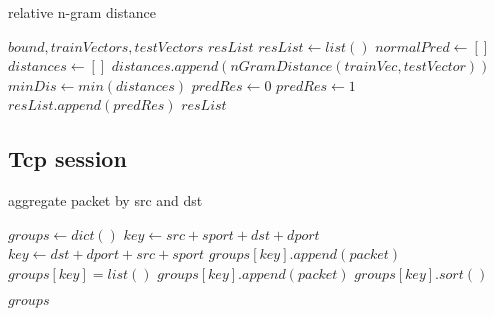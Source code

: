 \documentclass[preprint,12pt]{elsarticle}
\begin{document}
    \begin{algorithm}
        \caption{relative n-gram distance}
        \begin{algorithmic}[1]
            \Require $bound, trainVectors, testVectors$
            \Ensure $ resList$
            \State $ resList \gets list() $
            \State $normalPred \gets [] $
            \State $distances \gets []$
            \State $ distances.append(nGramDistance(trainVec, testVector))$
            \EndFor
            \State $minDis \gets min(distances)$
            \State $predRes \gets 0$
            \State $predRes \gets 1$
            \EndIf
            \State $resList.append(predRes)$
            \EndFor
            \State \Return $resList$
            \EndFunction
        \end{algorithmic}
    \end{algorithm}

    \subsection{Tcp session}
    \begin{algorithm}
        \caption{aggregate packet by src and dst}
        \begin{algorithmic}
            \State $ groups \gets dict() $
            \State $ key \gets src + sport + dst + dport $
            \Else
            \State $ key \gets dst + dport + src + sport $
            \EndIf
            \State $ groups[key].append(packet) $
            \Else
            \State $ groups[key] = list() $
            \State $ groups[key].append(packet) $
            \EndIf
            \EndFor
            \State  $ groups[key].sort() $
            \EndFor

            \State \Return $ groups $
            \EndFunction
        \end{algorithmic}
    \end{algorithm}
\end{document}
